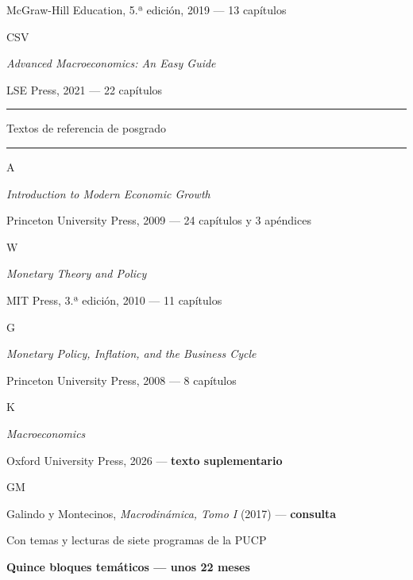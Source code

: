 \documentclass[11pt,a4paper]{article}
\newcommand{\etiqueta}[2]{%
  {\setlength{\fboxsep}{1.4pt}\colorbox{#1}{\sffamily\bfseries\color{white}\strut#2}}}
\begin{document}
\begin{titlepage}
{\small\color{tonoPizarra} McGraw-Hill Education, 5.ª edición, 2019 --- 13 capítulos\par}
\vspace{0.3cm}
{\large\etiqueta{colorCSV}{CSV} \par}
{\normalsize \emph{\color{colorCSV}Advanced Macroeconomics: An Easy Guide}\par}
{\small\color{tonoPizarra} LSE Press, 2021 --- 22 capítulos\par}
\vspace{0.6cm}
{\sffamily\large\bfseries\color{tonoPrincipal}\textcolor{tonoClaro}{\rule[0.5ex]{1.5cm}{0.6pt}}\quad Textos de referencia de posgrado\quad\textcolor{tonoClaro}{\rule[0.5ex]{1.5cm}{0.6pt}}\par}
\vspace{0.35cm}
{\large\etiqueta{colorA}{A} \par}
{\normalsize \emph{\color{colorA}Introduction to Modern Economic Growth}\par}
{\small\color{tonoPizarra} Princeton University Press, 2009 --- 24 capítulos y 3 apéndices\par}
\vspace{0.3cm}
{\large\etiqueta{colorW}{W} \par}
{\normalsize \emph{\color{colorW}Monetary Theory and Policy}\par}
{\small\color{tonoPizarra} MIT Press, 3.ª edición, 2010 --- 11 capítulos\par}
\vspace{0.3cm}
{\large\etiqueta{colorG}{G} \par}
{\normalsize \emph{\color{colorG}Monetary Policy, Inflation, and the Business Cycle}\par}
{\small\color{tonoPizarra} Princeton University Press, 2008 --- 8 capítulos\par}
\vspace{0.6cm}
{\large\etiqueta{colorK}{K} \par}
{\normalsize \emph{\color{colorK}Macroeconomics}\par}
{\small\color{tonoPizarra} Oxford University Press, 2026 --- \textbf{texto suplementario}\par}
\vspace{0.35cm}
{\small\etiqueta{colorGM}{GM} \quad Galindo y Montecinos, \emph{Macrodinámica, Tomo I} (2017) --- \textbf{consulta}\par}
\vspace{0.4cm}
{\normalsize\color{colorPUCP} Con temas y lecturas de siete programas de la PUCP\par}
\vfill
{\setlength{\fboxsep}{6pt}\colorbox{tonoPrincipal}{\normalsize\sffamily\bfseries\color{white} Quince bloques temáticos --- unos 22 meses}\par}
\vspace{0.4cm}
\end{titlepage}
\end{document}
